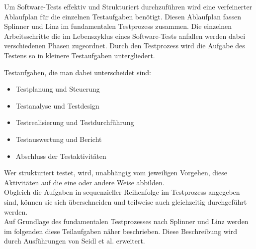 Um Software-Tests effektiv und Strukturiert durchzuführen wird eine verfeinerter Ablaufplan für die einzelnen Testaufgaben benötigt. Diesen Ablaufplan fassen Splinner und Linz \cite{spillner_basiswissen_2007} im fundamentalen Testprozess zusammen.  Die einzelnen Arbeitsschritte die im Lebenszyklus eines Software-Tests anfallen werden dabei verschiedenen Phasen zugeordnet.
Durch den Testprozess wird die Aufgabe des Testens so in kleinere Testaufgaben untergliedert.

Testaufgaben, die man dabei unterscheidet sind:

\begin{itemize}
	  \itemsep0pt
      \item Testplanung und Steuerung
      \item Testanalyse und Testdesign
      \item Testrealisierung und Testdurchführung
      \item Testauswertung und Bericht
      \item Abschluss der Testaktivitäten       
\end{itemize}

\glqq Wer strukturiert testet, wird, unabhängig vom jeweiligen Vorgehen, diese Aktivitäten auf die eine oder andere Weise abbilden.\grqq\ \cite[S. 9]{seidl_basiswissen_2012} \\
\glqq Obgleich die Aufgaben in sequenzieller Reihenfolge im Testprozess angegeben sind, können sie sich überschneiden und teilweise auch gleichzeitig durchgeführt werden.\grqq\ \cite[S.19]{spillner_basiswissen_2007} \\ Auf Grundlage des fundamentalen Testprozesses nach Splinner und Linz \cite[S.20ff]{spillner_basiswissen_2007} werden im folgenden diese Teilaufgaben näher beschrieben. 
Diese Beschreibung wird durch Ausführungen von Seidl et al. \cite[S. 9 ff.]{seidl_basiswissen_2012} erweitert. 

